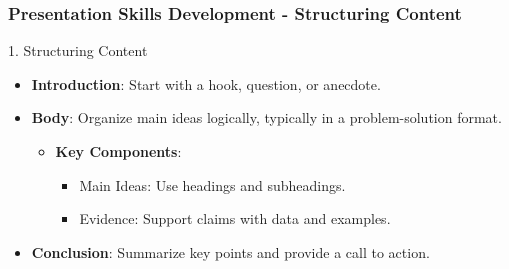 \documentclass[aspectratio=169]{beamer}
\begin{document}
\begin{frame}[fragile]
    \frametitle{Presentation Skills Development - Structuring Content}
    \begin{block}{1. Structuring Content}
        \begin{itemize}
            \item \textbf{Introduction}: Start with a hook, question, or anecdote.
            \item \textbf{Body}: Organize main ideas logically, typically in a problem-solution format.
            \begin{itemize}
                \item \textbf{Key Components}:
                \begin{itemize}
                    \item Main Ideas: Use headings and subheadings.
                    \item Evidence: Support claims with data and examples.
                \end{itemize}
            \end{itemize}
            \item \textbf{Conclusion}: Summarize key points and provide a call to action.
        \end{itemize}
    \end{block}
\end{frame}
\end{document}
